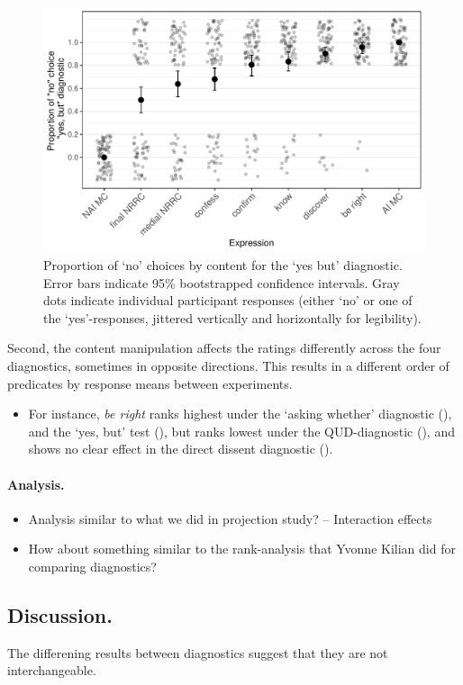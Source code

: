\documentclass[12pt]{article}
\begin{document}
    \begin{figure}[ht]
    \vspace{-2\baselineskip}
      \caption{Proportion of ‘no’ choices by content for the `yes but' diagnostic. Error bars indicate 95\% bootstrapped confidence intervals. Gray dots indicate individual participant responses (either ‘no’ or one of the ‘yes’-responses, jittered vertically and horizontally for legibility).} \label{fig:yb}
      \vspace{-.5\baselineskip}
      \centering
      \includegraphics[width=.48\textwidth]{../../results/main/exp4/graphs/mean-ratings.pdf}
    \end{figure}

    Second, the content manipulation affects the ratings differently across the four diagnostics, sometimes in opposite directions. This results in a different order of predicates by response means between experiments.
    \begin{itemize}
      \item For instance, \emph{be right} ranks highest under the `asking whether' diagnostic (), and the `yes, but' test (), but ranks lowest under the QUD-diagnostic (), and shows no clear effect in the direct dissent diagnostic ().
    \end{itemize}
    

    \paragraph{Analysis.}
    \begin{itemize}
      \item Analysis similar to what we did in projection study? -- Interaction effects
      \item How about something similar to the rank-analysis that Yvonne Kilian did for comparing diagnostics?

    \end{itemize}


  \subsection{Discussion.}
    The differening results between diagnostics suggest that they are not interchangeable.
\end{document}
